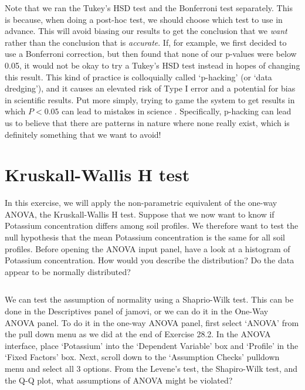 \documentclass[
]{scrbook}
\begin{document}
Note that we ran the Tukey's HSD test and the Bonferroni test separately.
This is because, when doing a post-hoc test, we should choose which test to use in advance.
This will avoid biasing our results to get the conclusion that we \emph{want} rather than the conclusion that is \emph{accurate}.
If, for example, we first decided to use a Bonferroni correction, but then found that none of our p-values were below 0.05, it would not be okay to try a Tukey's HSD test instead in hopes of changing this result.
This kind of practice is colloquially called `p-hacking' (or `data dredging'), and it causes an elevated risk of Type I error and a potential for bias in scientific results.
Put more simply, trying to game the system to get results in which \(P < 0.05\) can lead to mistakes in science \citep{Head2015}.
Specifically, p-hacking can lead us to believe that there are patterns in nature where none really exist, which is definitely something that we want to avoid!

\hypertarget{kruskall-wallis-h-test}{%
\section{Kruskall-Wallis H test}\label{kruskall-wallis-h-test}}

In this exercise, we will apply the non-parametric equivalent of the one-way ANOVA, the Kruskall-Wallis H test.
Suppose that we now want to know if Potassium concentration differs among soil profiles.
We therefore want to test the null hypothesis that the mean Potassium concentration is the same for all soil profiles.
Before opening the ANOVA input panel, have a look at a histogram of Potassium concentration.
How would you describe the distribution?
Do the data appear to be normally distributed?

\begin{verbatim}

\end{verbatim}

We can test the assumption of normality using a Shaprio-Wilk test.
This can be done in the Descriptives panel of jamovi, or we can do it in the One-Way ANOVA panel.
To do it in the one-way ANOVA panel, first select `ANOVA' from the pull down menu as we did at the end of Exercise 28.2.
In the ANOVA interface, place `Potassium' into the `Dependent Variable' box and `Profile' in the `Fixed Factors' box.
Next, scroll down to the `Assumption Checks' pulldown menu and select all 3 options.
From the Levene's test, the Shapiro-Wilk test, and the Q-Q plot, what assumptions of ANOVA might be violated?
\end{document}

